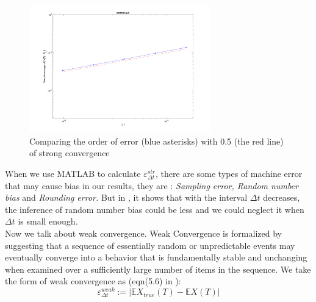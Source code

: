 \documentclass[12pt,a4paper]{article}
\theoremstyle{definition}
\begin{document}
\begin{figure}[htbp]
\centering
\includegraphics[width=0.7\textwidth]{fig/fig5.png}
\caption{\label{fig5} Comparing the order of error (blue asterisks) with 0.5 (the red line) of strong convergence  }
\end{figure}

When we use MATLAB to calculate $\varepsilon_{\Delta t}^{str}$, there are some types of machine error that may cause bias in our results, they are \cite{higham._2001}: \textit{Sampling error, Random number bias} and \textit{Rounding error.} But in \cite{Saito}, it shows that with the interval $\Delta t$ decreases, the inference of random number bias could be less and we could neglect it when $\Delta t$
is small enough.\\

Now we talk about weak convergence. Weak Convergence  is formalized by suggesting that a sequence of essentially random or unpredictable events may eventually converge into a behavior that is fundamentally stable and unchanging when examined over a sufficiently large number of items in the sequence. We take the form of weak convergence as (eqn(5.6) in \cite{higham._2001}):
\begin{equation}
    \label{weakem} \varepsilon_{\Delta t}^{weak} :=|\mathbb{E}X_{true}(T)-\mathbb{E}X(T)|
\end{equation}
\end{document}
